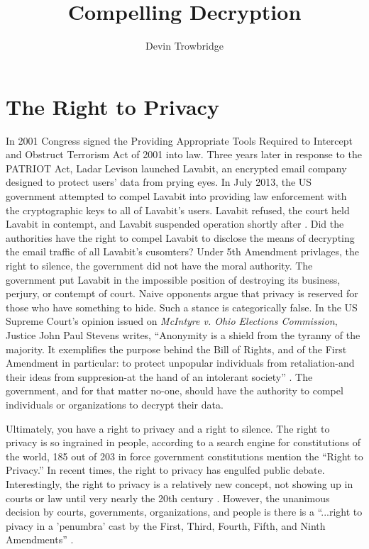 \documentclass[format=sigconf]{acmart}
\title{Compelling Decryption}
\author{Devin Trowbridge}
\affiliation{%
  \department{Computer Science and Software Engineering}
  \institution{Auburn University}
  \email{dkt0003@auburn.edu}
  \city{Huntsville}
  \state{Alabama}
  \country{United States}
}
\begin{document}
\maketitle

\section{The Right to Privacy}

In 2001 Congress signed the Providing Appropriate Tools Required to Intercept and Obstruct Terrorism Act of 2001 into law. Three years later in response to the PATRIOT Act, Ladar Levison launched Lavabit, an encrypted email company designed to protect users' data from prying eyes. In July 2013, the US government attempted to compel Lavabit into providing law enforcement with the cryptographic keys to all of Lavabit's users. Lavabit refused, the court held Lavabit in contempt, and Lavabit suspended operation shortly after \cite{lavabit}. Did the authorities have the right to compel Lavabit to disclose the means of decrypting the email traffic of all Lavabit's cusomters? Under 5th Amendment privlages, the right to silence, the government did not have the moral authority. The government put Lavabit in the impossible position of destroying its business, perjury, or contempt of court. Naive opponents argue that privacy is reserved for those who have something to hide. Such a stance is categorically false. In the US Supreme Court's opinion issued on \textit{McIntyre v. Ohio Elections Commission}, Justice John Paul Stevens writes, ``Anonymity is a shield from the tyranny of the majority. It exemplifies the purpose behind the Bill of Rights, and of the First Amendment in particular: to protect unpopular individuals from retaliation-and their ideas from suppresion-at the hand of an intolerant society'' \cite{stevens}. The government, and for that matter no-one, should have the authority to compel individuals or organizations to decrypt their data.

Ultimately, you have a right to privacy and a right to silence.  The right to privacy is so ingrained in people, according to a search engine for constitutions of the world, 185 out of 203 in force government constitutions mention the ``Right to Privacy.'' In recent times, the right to privacy has engulfed public debate. Interestingly, the right to privacy is a relatively new concept, not showing up in courts or law until very nearly the 20th century \cite{haydel}. However, the unanimous decision by courts, governments, organizations, and people is there is a ``...right to pivacy in a 'penumbra' cast by the First, Third, Fourth, Fifth, and Ninth Amendments'' \cite{haydel}.
\end{document}
